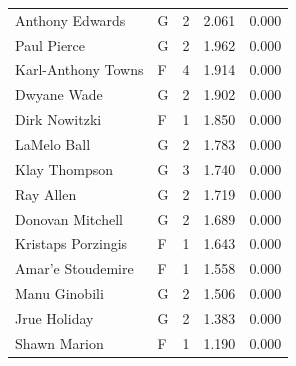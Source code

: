 \begin{table}[t]
\begin{tabular*}{\linewidth}{@{\extracolsep{\fill}}llcrr}
Anthony Edwards & G & 2 & 2.061 & 0.000 \\ 
Paul Pierce & G & 2 & 1.962 & 0.000 \\ 
Karl-Anthony Towns & F & 4 & 1.914 & 0.000 \\ 
Dwyane Wade & G & 2 & 1.902 & 0.000 \\ 
Dirk Nowitzki & F & 1 & 1.850 & 0.000 \\ 
LaMelo Ball & G & 2 & 1.783 & 0.000 \\ 
Klay Thompson & G & 3 & 1.740 & 0.000 \\ 
Ray Allen & G & 2 & 1.719 & 0.000 \\ 
Donovan Mitchell & G & 2 & 1.689 & 0.000 \\ 
Kristaps Porzingis & F & 1 & 1.643 & 0.000 \\ 
Amar'e Stoudemire & F & 1 & 1.558 & 0.000 \\ 
Manu Ginobili & G & 2 & 1.506 & 0.000 \\ 
Jrue Holiday & G & 2 & 1.383 & 0.000 \\ 
Shawn Marion & F & 1 & 1.190 & 0.000 \\ 
\bottomrule
\end{tabular*}
\end{table}

